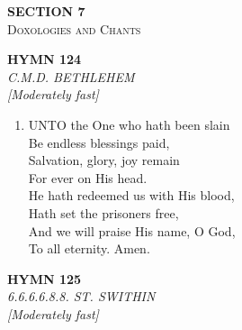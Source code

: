 \newpage
\thispagestyle{empty}
\vspace*{3.5cm}
\begin{center}
    {\LARGE \textbf{SECTION 7}}\\[0.8em]
    {\Large \textsc{Doxologies and Chants}}
\end{center}
\vspace{3.5cm}

\newpage
\begin{center}
    {\Large \textbf{HYMN 124}}
    \\
    \textit{C.M.D. BETHLEHEM}
    \\
    \textit{\small [Moderately fast]}
\end{center}
\vspace{1em}

\begin{enumerate}
    \item UNTO the One who hath been slain \\
        Be endless blessings paid, \\
        Salvation, glory, joy remain \\
        For ever on His head. \\
        He hath redeemed us with His blood, \\
        Hath set the prisoners free, \\
        And we will praise His name, O God, \\
        To all eternity. Amen.

\end{enumerate}

\newpage
\begin{center}
    {\Large \textbf{HYMN 125}}
    \\
    \textit{6.6.6.6.8.8. ST. SWITHIN}
    \\
    \textit{\small [Moderately fast]}
\end{center}
\vspace{1em}

